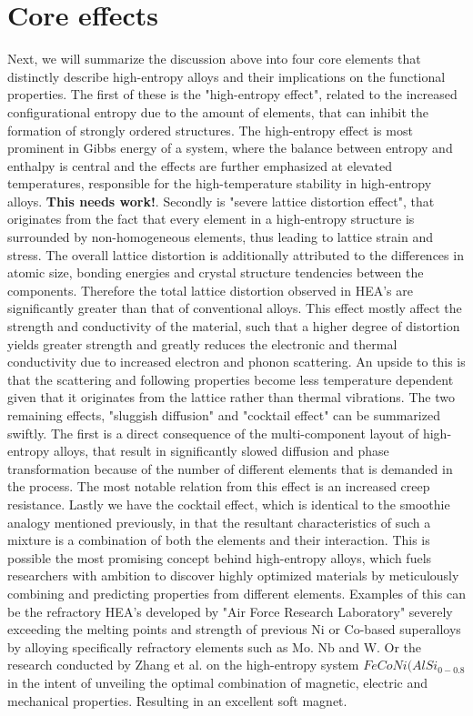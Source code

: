 \section{Core effects}
Next, we will summarize the discussion above into four core elements that distinctly describe high-entropy alloys and their implications on the functional properties. The first of these is the "high-entropy effect", related to the increased configurational entropy due to the amount of elements, that can inhibit the formation of strongly ordered structures. The high-entropy effect is most prominent in Gibbs energy of a system, where the balance between entropy and enthalpy is central and the effects are further emphasized at elevated temperatures, responsible for the high-temperature stability in high-entropy alloys.  \textbf{This needs work!}. Secondly is "severe lattice distortion effect", that originates from the fact that every element in a high-entropy structure is surrounded by non-homogeneous elements, thus leading to lattice strain and stress. The overall lattice distortion is additionally attributed to the differences in atomic size, bonding energies and crystal structure tendencies between the components. Therefore the total lattice distortion observed in HEA's are significantly greater than that of conventional alloys. This effect mostly affect the strength and conductivity of the material, such that a higher degree of distortion yields greater strength and greatly reduces the electronic and thermal conductivity due to increased electron and phonon scattering. An upside to this is that the scattering and following properties become less temperature dependent given that it originates from the lattice rather than thermal vibrations. 
The two remaining effects, "sluggish diffusion" and "cocktail effect" can be summarized swiftly. The first is a direct consequence of the multi-component layout of high-entropy alloys, that result in significantly slowed diffusion and phase transformation because of the number of different elements that is demanded in the process. The most notable relation from this effect is an increased creep resistance. Lastly we have the cocktail effect, which is identical to the smoothie analogy mentioned previously, in that the resultant characteristics of such a mixture is a combination of both the elements and their interaction. This is possible the most promising concept behind high-entropy alloys, which fuels researchers with ambition to discover highly optimized materials by meticulously combining and predicting properties from different elements. Examples of this can be the refractory HEA's developed by "Air Force Research Laboratory" severely exceeding the melting points and strength of previous Ni or Co-based superalloys by alloying specifically refractory elements such as Mo. Nb and W. Or the research conducted by Zhang et al. on the high-entropy system $FeCoNi(AlSi_{0-0.8}$ in the intent of unveiling the optimal combination of magnetic, electric and mechanical properties. Resulting in an excellent soft magnet. 

